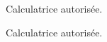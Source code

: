 
\vfill



\begin{multicols}{2}
    \begin{center}
        Calculatrice autorisée.
    \end{center}


\columnbreak


    \begin{center}
        Calculatrice autorisée.
    \end{center}


\vfill

\end{multicols}
